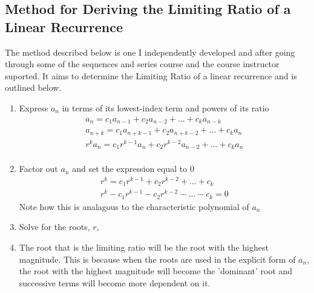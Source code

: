 \documentclass[11pt]{article}
\begin{document}
\subsection{Method for Deriving the Limiting Ratio of a Linear Recurrence}
The method described below is one I independently developed and after going through some of the sequences and series course and the course instructor suported. It aims to determine the Limiting Ratio of a linear recurrence and is outlined below.
\begin{enumerate}
    \item Express $a_n$ in terms of its lowest-index term and powers of its ratio 
    \begin{align*}
        a_n=c_1a_{n-1}+c_2a_{n-2}+\dots +c_ka_{n-k} \\
        a_{n+k}=c_1a_{n+k-1}+c_2a_{n+k-2}+\dots +c_ka_{n} \\
        r^{k}a_{n}=c_1r^{k-1}a_{n}+c_2r^{k-2}a_{n-2}+\dots +c_ka_{n} \\
    \end{align*}
    \item Factor out $a_n$ and set the expression equal to 0
    \begin{align*}
        r^{k}=c_1r^{k-1}+c_2r^{k-2}+\dots +c_k \\
        r^{k}-c_1r^{k-1}-c_2r^{k-2}-\dots -c_k=0
    \end{align*}
    Note how this is analagous to the characteristic polynomial of $a_n$
    \item Solve for the roots, $r$, 
    \item The root that is the limiting ratio will be the root with the highest magnitude. This is because when the roots are used in the explicit form of $a_n$, the root with the highest magnitude will become the 'dominant' root and successive terms will become more dependent on it. 
\end{enumerate}
\end{document}
